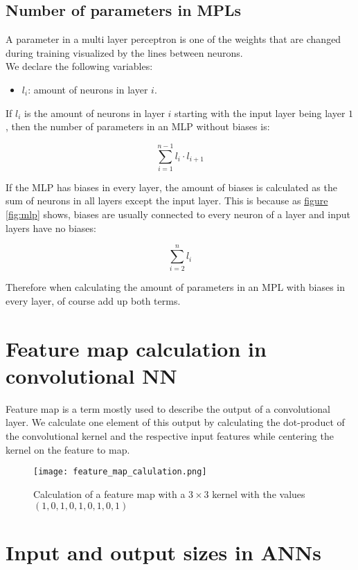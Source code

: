 \subsection{Number of parameters in MPLs}

A parameter in a multi layer perceptron is one of the weights that are changed during training visualized by the lines between neurons.\\

We declare the following variables:
\begin{itemize}
    \item $l_{i}$: amount of neurons in layer $i$.
\end{itemize}

If $l_{i}$ is the amount of neurons in layer $i$ starting with the input layer being layer $1$, then the number of parameters in an MLP without biases is:

$$
    \sum_{i=1}^{n-1}l_{i}\cdot{l_{i+1}}
$$

If the MLP has biases in every layer, the amount of biases is calculated as the sum of neurons in all layers except the input layer. This is because as \hyperref[fig:mlp]{figure \ref*{fig:mlp}} shows, biases are usually connected to every neuron of a layer and input layers have no biases:

$$
    \sum_{i=2}^{n}l_{i}
$$

Therefore when calculating the amount of parameters in an MPL with biases in every layer, of course add up both terms.

\section{Feature map calculation in convolutional NN}

Feature map is a term mostly used to describe the output of a convolutional layer. We calculate one element of this output by calculating the dot-product of the convolutional kernel and the respective input features while centering the kernel on the feature to map.

\begin{figure}[h]
    \centering
    \texttt{[image: feature\_map\_calulation.png]}
    \caption{Calculation of a feature map with a $3 \times 3$ kernel with the values $(1, 0, 1, 0, 1, 0, 1, 0, 1)$}
    \label{fig:feature_map_conv_net}
\end{figure}

\section{Input and output sizes in ANNs}

